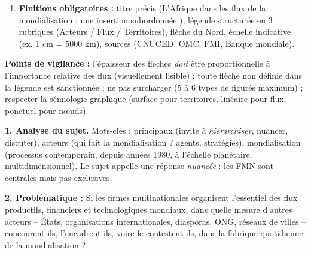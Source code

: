 \documentclass[11pt]{article}
\begin{document}
\begin{corrige}
\begin{enumerate}
    \item \textbf{Finitions obligatoires :} titre précis (\og L'Afrique dans les flux de la mondialisation : une insertion subordonnée \fg), légende structurée en 3 rubriques (Acteurs / Flux / Territoires), flèche du Nord, échelle indicative (ex. 1 cm = 5000 km), sources (CNUCED, OMC, FMI, Banque mondiale).
\end{enumerate}
\textbf{Points de vigilance :} l'épaisseur des flèches \emph{doit} être proportionnelle à l'importance relative des flux (visuellement lisible) ; toute flèche non définie dans la légende est sanctionnée ; ne pas surcharger (5 à 6 types de figurés maximum) ; respecter la sémiologie graphique (surface pour territoires, linéaire pour flux, ponctuel pour nœuds).
\end{corrige}

\begin{corrige}
\textbf{1. Analyse du sujet.} Mots-clés : \og principaux \fg{} (invite à \emph{hiérarchiser}, nuancer, discuter), \og acteurs \fg{} (qui fait la mondialisation ? agents, stratégies), \og mondialisation \fg{} (processus contemporain, depuis années 1980, à l'échelle planétaire, multidimensionnel). Le sujet appelle une réponse \emph{nuancée} : les FMN sont centrales mais pas exclusives.

\textbf{2. Problématique :} Si les firmes multinationales organisent l'essentiel des flux productifs, financiers et technologiques mondiaux, dans quelle mesure d'autres acteurs -- États, organisations internationales, diasporas, ONG, réseaux de villes -- concourent-ils, l'encadrent-ils, voire le contestent-ils, dans la fabrique quotidienne de la mondialisation ?


\end{corrige}
\end{document}
